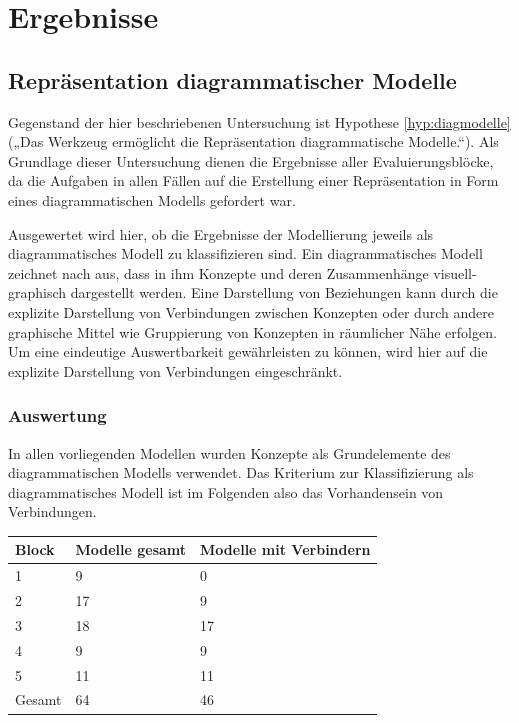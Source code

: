 
\section{Ergebnisse} %
\label{sec:ergebnisse}

\subsection{Repräsentation diagrammatischer Modelle} %
\label{sub:repräsentation_diagrammatischer_modelle}

Gegenstand der hier beschriebenen Untersuchung ist Hypothese \ref{hyp:diagmodelle} („Das Werkzeug ermöglicht die Repräsentation diagrammatische Modelle.“). Als Grundlage dieser Untersuchung dienen die Ergebnisse aller Evaluierungsblöcke, da die Aufgaben in allen Fällen auf die Erstellung einer Repräsentation in Form eines diagrammatischen Modells gefordert war.

Ausgewertet wird hier, ob die Ergebnisse der Modellierung jeweils als diagrammatisches Modell zu klassifizieren sind. Ein diagrammatisches Modell zeichnet nach \citep{Larkin87} aus, dass in ihm Konzepte und deren Zusammenhänge visuell-graphisch dargestellt werden. Eine Darstellung von Beziehungen kann durch die explizite Darstellung von Verbindungen zwischen Konzepten oder durch andere graphische Mittel wie Gruppierung von Konzepten in räumlicher Nähe erfolgen. Um eine eindeutige Auswertbarkeit gewährleisten zu können, wird hier auf die explizite Darstellung von Verbindungen eingeschränkt. 

\subsubsection{Auswertung} %

In allen vorliegenden Modellen wurden Konzepte als Grundelemente des diagrammatischen Modells verwendet. Das Kriterium zur Klassifizierung als diagrammatisches Modell ist im Folgenden also das Vorhandensein von Verbindungen.

\begin{tabular}{| p{3cm} || p{3cm} | p{3cm} |}
  \hline
   Block & Modelle gesamt & Modelle mit Verbindern \\ \hline
   1 & 9 & 0 \\ 
   2 & 17 & 9 \\ 
   3 & 18 & 17 \\ 
   4 & 9 & 9 \\ 
   5 & 11 & 11 \\ \hline
   Gesamt & 64 & 46 \\ \hline
\end{tabular}

